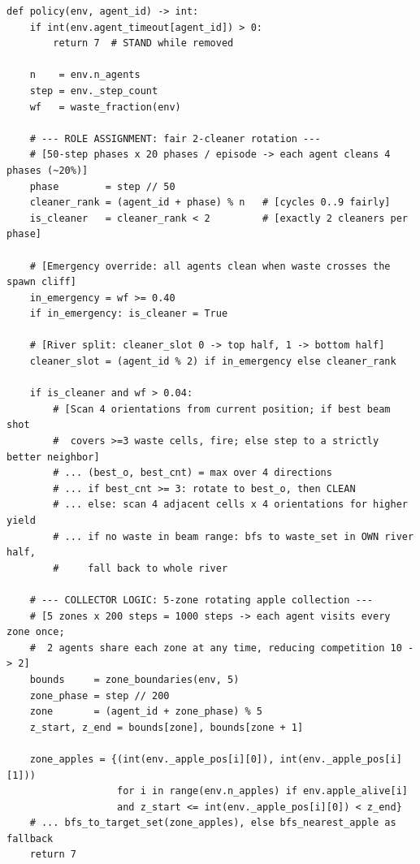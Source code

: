 \documentclass{article}
\begin{document}
\begin{lstlisting}[style=pythonpolicy, caption={Cleanup, $\Phi_{\min}$ -- Sonnet 4.6 (rotation variant; see Appendix~\ref{app:policy-min-sonnet} for the alternative synchronized clean/collect mechanism in the second Sonnet maximin run). Phase-rotated cleaning + zone-rotated collection (verbatim, abridged).}, label={lst:min-sonnet}]
def policy(env, agent_id) -> int:
    if int(env.agent_timeout[agent_id]) > 0:
        return 7  # STAND while removed

    n    = env.n_agents
    step = env._step_count
    wf   = waste_fraction(env)

    # --- ROLE ASSIGNMENT: fair 2-cleaner rotation ---
    # [50-step phases x 20 phases / episode -> each agent cleans 4 phases (~20%)]
    phase        = step // 50
    cleaner_rank = (agent_id + phase) % n   # [cycles 0..9 fairly]
    is_cleaner   = cleaner_rank < 2         # [exactly 2 cleaners per phase]

    # [Emergency override: all agents clean when waste crosses the spawn cliff]
    in_emergency = wf >= 0.40
    if in_emergency: is_cleaner = True

    # [River split: cleaner_slot 0 -> top half, 1 -> bottom half]
    cleaner_slot = (agent_id % 2) if in_emergency else cleaner_rank

    if is_cleaner and wf > 0.04:
        # [Scan 4 orientations from current position; if best beam shot
        #  covers >=3 waste cells, fire; else step to a strictly better neighbor]
        # ... (best_o, best_cnt) = max over 4 directions
        # ... if best_cnt >= 3: rotate to best_o, then CLEAN
        # ... else: scan 4 adjacent cells x 4 orientations for higher yield
        # ... if no waste in beam range: bfs to waste_set in OWN river half,
        #     fall back to whole river

    # --- COLLECTOR LOGIC: 5-zone rotating apple collection ---
    # [5 zones x 200 steps = 1000 steps -> each agent visits every zone once;
    #  2 agents share each zone at any time, reducing competition 10 -> 2]
    bounds     = zone_boundaries(env, 5)
    zone_phase = step // 200
    zone       = (agent_id + zone_phase) % 5
    z_start, z_end = bounds[zone], bounds[zone + 1]

    zone_apples = {(int(env._apple_pos[i][0]), int(env._apple_pos[i][1]))
                   for i in range(env.n_apples) if env.apple_alive[i]
                   and z_start <= int(env._apple_pos[i][0]) < z_end}
    # ... bfs_to_target_set(zone_apples), else bfs_nearest_apple as fallback
    return 7
\end{lstlisting}
\end{document}
